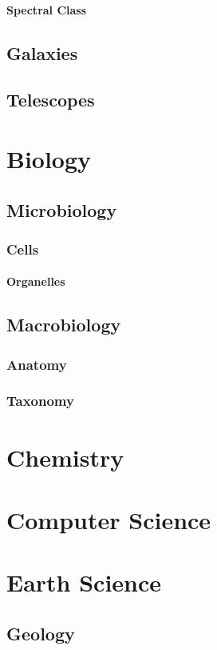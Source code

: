 				\paragraph{Spectral Class} \label{spectralclass}
		\subsection{Galaxies}
		\subsection{Telescopes}

	\section{Biology}
		\subsection{Microbiology}
			\subsubsection{Cells}
				\paragraph{Organelles}
		\subsection{Macrobiology}
			\subsubsection{Anatomy}
			\subsubsection{Taxonomy}
					
	\section{Chemistry}
	\section{Computer Science}
	\newpage
	\section{Earth Science}
		\subsection{Geology}
